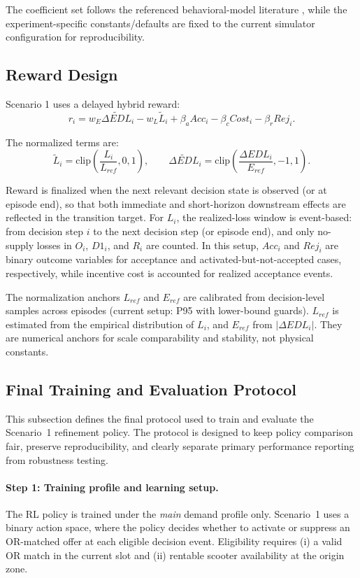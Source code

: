 The coefficient set follows the referenced behavioral-model literature \parencite{burghardt2025behavioral,momen2025}, while the experiment-specific constants/defaults are fixed to the current simulator configuration for reproducibility.

\subsection{Reward Design}

Scenario 1 uses a delayed hybrid reward:
\[
r_i
=
w_E\widetilde{\Delta EDL}_i
-
w_L\widetilde{L}_i
+
\beta_a Acc_i
-
\beta_c Cost_i
-
\beta_r Rej_i.
\]

The normalized terms are:
\[
\widetilde{L}_i
=
\mathrm{clip}\!\left(\frac{L_i}{L_{ref}},0,1\right),\qquad
\widetilde{\Delta EDL}_i
=
\mathrm{clip}\!\left(\frac{\Delta EDL_i}{E_{ref}},-1,1\right).
\]

Reward is finalized when the next relevant decision state is observed (or at episode end), so that both immediate and short-horizon downstream effects are reflected in the transition target. For \(L_i\), the realized-loss window is event-based: from decision step \(i\) to the next decision step (or episode end), and only no-supply losses in \(O_i\), \(D1_i\), and \(R_i\) are counted. In this setup, \(Acc_i\) and \(Rej_i\) are binary outcome variables for acceptance and activated-but-not-accepted cases, respectively, while incentive cost is accounted for realized acceptance events.

The normalization anchors \(L_{ref}\) and \(E_{ref}\) are calibrated from decision-level samples across episodes (current setup: P95 with lower-bound guards). \(L_{ref}\) is estimated from the empirical distribution of \(L_i\), and \(E_{ref}\) from \(|\Delta EDL_i|\). They are numerical anchors for scale comparability and stability, not physical constants.

\subsection{Final Training and Evaluation Protocol}

This subsection defines the final protocol used to train and evaluate the Scenario~1 refinement policy.  
The protocol is designed to keep policy comparison fair, preserve reproducibility, and clearly separate primary performance reporting from robustness testing.

\paragraph{Step 1: Training profile and learning setup.}
The RL policy is trained under the \textit{main} demand profile only.  
Scenario~1 uses a binary action space, where the policy decides whether to activate or suppress an OR-matched offer at each eligible decision event.  
Eligibility requires (i) a valid OR match in the current slot and (ii) rentable scooter availability at the origin zone.


